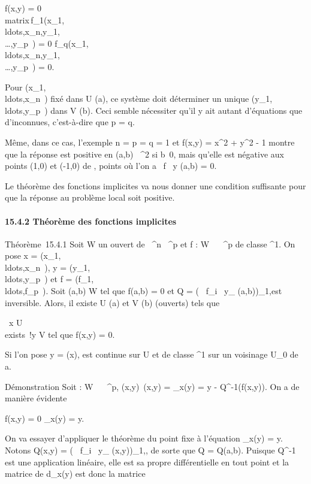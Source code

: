 \documentclass[]{article}
\begin{document}
f(x,y) = 0 \Leftrightarrow \left
\\matrix\,f\_1(x\_1,\\ldots,x\_n,y\_1,\\\ldots,y\_p~)
= 0 \cr \cr
f\_q(x\_1,\\ldots,x\_n,y\_1,\\\ldots,y\_p~)
= 0\right .

Pour
(x\_1,\\ldots,x\_n~)
fixé dans U \inV(a), ce système doit déterminer un unique
(y\_1,\\ldots,y\_p~)
dans V \inV(b). Ceci semble nécessiter qu'il y ait autant d'équations que
d'inconnues, c'est-à-dire que p = q.

Même, dans ce cas, l'exemple n = p = q = 1 et f(x,y) = x^2 +
y^2 - 1 montre que la réponse est positive en (a,b) \in
{}~^2 si b\neq~0, mais qu'elle est
négative aux points (1,0) et (-1,0) de \Gamma, points où l'on a  \partial~f
\over \partial~y (a,b) = 0.

Le théorème des fonctions implicites va nous donner une condition
suffisante pour que la réponse au problème local soit positive.

\paragraph{15.4.2 Théorème des fonctions implicites}

Théorème~15.4.1 Soit W un ouvert de ~^n \times {}~^p et f
: W \rightarrow~ ~^p de classe ^1. On pose x =
(x\_1,\\ldots,x\_n~),
y =
(y\_1,\\ldots,y\_p~)
et f =
(f\_1,\\ldots,f\_p~).
Soit (a,b) \in W tel que f(a,b) = 0 et Q = \left (
\partial~f\_i \over \partial~y\_\jmath
(a,b)\right )\_1\leqi,\jmath\leqp est inversible. Alors, il
existe U \inV(a) et V \inV(b) (ouverts) tels que

\forall~x \in U \\exists~!y \in V
\text tel que f(x,y) = 0.

Si l'on pose y = \phi(x), \phi est continue sur U et de classe ^1
sur un voisinage U\_0 de a.

Démonstration Soit \psi : W \rightarrow~ ~^p,
(x,y)\mapsto~\psi(x,y) = \psi\_x(y) = y -
Q^-1(f(x,y)). On a de manière évidente

f(x,y) = 0 \Leftrightarrow \psi\_x(y) = y.

On va essayer d'appliquer le théorème du point fixe à l'équation
\psi\_x(y) = y. Notons Q(x,y) = \left (
\partial~f\_i \over \partial~y\_\jmath
(x,y)\right )\_1\leqi,\jmath\leqp, de sorte que Q = Q(a,b).
Puisque Q^-1 est une application linéaire, elle est sa propre
différentielle en tout point et la matrice de d\psi\_x(y) est donc
la matrice
\end{document}

